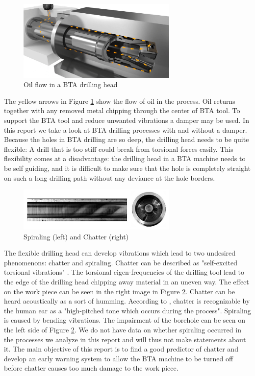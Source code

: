 \documentclass[12 pt]{scrartcl}
\begin{document}
\begin{figure}[ht]
  \centering
  \includegraphics[width=0.7\textwidth]{../images/drillhead.jpg}
  \caption{Oil flow in a BTA drilling head \citep{botek2023}}
  \label{fig:drillhead}
\end{figure}

The yellow arrows in Figure \ref{fig:drillhead} show the flow of oil in the process. Oil returns together with any removed metal chipping through the center of BTA tool.
To support the BTA tool and reduce unwanted vibrations a damper may be used. In this report we take a look at BTA drilling processes with and without a damper.
Because the holes in BTA drilling are so deep, the drilling head needs to be quite flexible: A drill that is too stiff could break from torsional forces easily. This flexibility comes at a disadvantage: the drilling head in a BTA machine needs to be self guiding, and it is difficult to make sure that the hole is completely straight on such a long drilling path without any deviance at the hole borders.

\begin{figure}[ht]
  \centering
  \includegraphics[width=0.7\textwidth]{../images/chatterspiral.jpg}
  \caption{Spiraling (left) and Chatter (right) \citep[p.~746]{raabe2010dynamic}}
  \label{fig:chatterspiral}
\end{figure}

The flexible drilling head can develop vibrations which lead to two undesired phenomenons: chatter and spiraling.
Chatter can be described as "self-excited torsional vibrations" \citep[p.~746]{raabe2010dynamic}. The torsional eigen-frequencies of the drilling tool lead to the edge of the drilling head chipping away material in an uneven way. The effect on the work piece can be seen in the right image in Figure \ref{fig:chatterspiral}. Chatter can be heard acoustically as a sort of humming. According to \citet[p.~14]{theis2004modelling}, chatter is recognizable by the human ear as a "high-pitched tone which occurs
during the process".
Spiraling is caused by bending vibrations. The impairment of the borehole can be seen on the left side of  Figure \ref{fig:chatterspiral}. We do not have data on whether spiraling occurred in the processes we analyze in this report and will thus not make statements about it.
The main objective of this report is to find a good predictor of chatter and develop an early warning system to allow the BTA machine to be turned off before chatter causes too much damage to the work piece.
\end{document}
